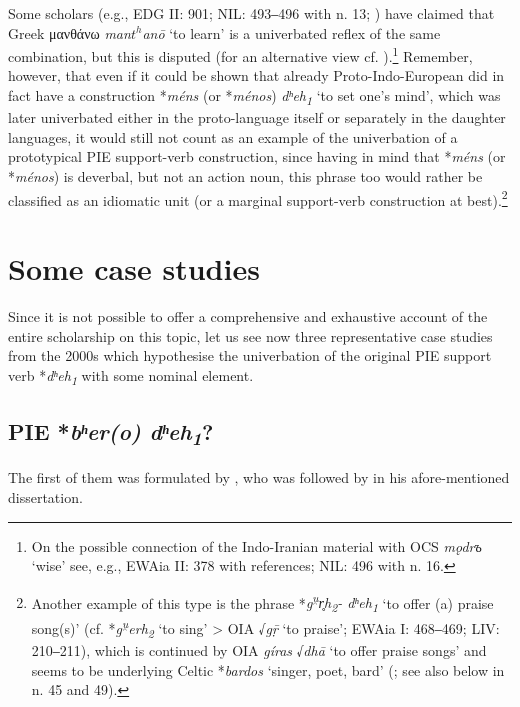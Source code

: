 \documentclass[output=paper,colorlinks,citecolor=brown]{langscibook}
\begin{document}
Some scholars (e.g., EDG II: 901; NIL: 493‒496 with n. 13; \citealt[281 n. 6]{Peschl2022}) have claimed that Greek μανθάνω \textit{man$t^h$anō} ‘to learn’ is a univerbated reflex of the same combination, but this is disputed (for an alternative view cf. \citealt[125]{Klingenschmitt1982}).\footnote{On the possible connection of the Indo-Iranian material with OCS \textit{mǫdrъ} ‘wise’ see, e.g., EWAia II: 378 with references; NIL: 496 with n. 16.}                    Remember, however, that even if it could be shown that already Proto-Indo-European did in fact have a construction *\textit{méns} (or *\textit{ménos}) \textit{dʰeh\textsubscript{1}} ‘to set one’s mind’, which was later univerbated either in the proto-language itself or separately in the daughter languages, it would still not count as an example of the univerbation of a prototypical PIE support-verb construction, since having in mind that *\textit{méns} (or *\textit{ménos}) is deverbal, but not an action noun, this phrase too would rather be classified as an idiomatic unit (or a marginal support-verb construction at best).\footnote{Another example of this type is the phrase *\textit{g\textsuperscript{u̯}r̥h\textsubscript{2}- dʰeh\textsubscript{1}} ‘to offer (a) praise song(s)’ (cf. *\textit{g\textsuperscript{u̯}erh\textsubscript{2}} ‘to sing’ > OIA √\textit{gṝ} ‘to praise’; EWAia I: 468‒469; LIV: 210‒211), which is continued by OIA \textit{gíras} √\textit{dhā} ‘to offer praise songs’ and seems to be underlying Celtic *\textit{bardos} ‘singer, poet, bard’ (\citealt[37--38]{Balles2006}; see also below in n. 45 and 49).}

\section{Some case studies}

Since it is not possible to offer a comprehensive and exhaustive account of the entire scholarship on this topic, let us see now three representative case studies from the 2000s which hypothesise the univerbation of the original PIE support verb *\textit{dʰeh\textsubscript{1}} with some nominal element.

\subsection{PIE *\textit{bʰer(o) dʰeh\textsubscript{1}}?}

The first of them was formulated by \citet[240--241]{Janda2000}, who was followed by \citet[107--108]{Schutzeichel2014} in his afore-mentioned dissertation.
\end{document}
